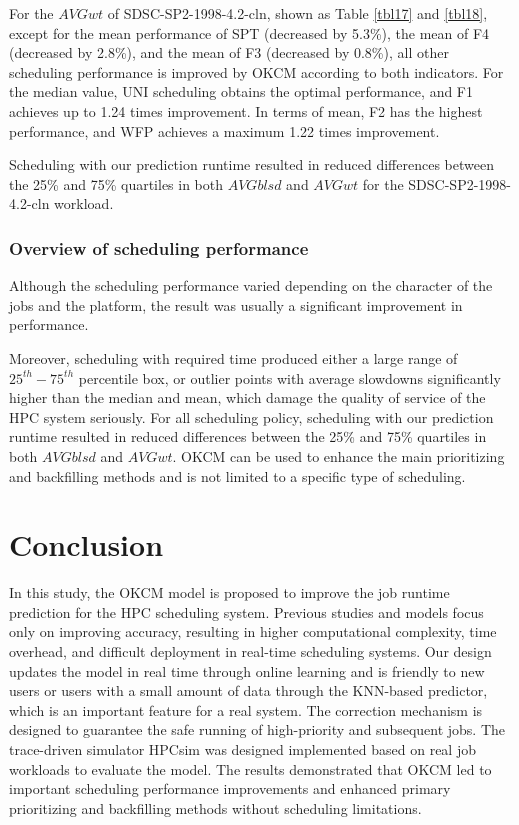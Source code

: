 \documentclass[a4paper,fleqn]{cas-sc}
\begin{document}
For the $A\!V\!Gwt$ of SDSC-SP2-1998-4.2-cln, shown as Table \ref{tbl17} and \ref{tbl18}, except for the mean performance of SPT (decreased by 5.3\%), the mean of F4 (decreased by 2.8\%), and the mean of F3 (decreased by 0.8\%), all other scheduling performance is improved by OKCM according to both indicators. For the median value, UNI scheduling obtains the optimal performance, and F1 achieves up to 1.24 times improvement. In terms of mean, F2 has the highest performance, and WFP achieves a maximum 1.22 times improvement. 

Scheduling with our prediction runtime resulted in reduced differences between the 25\% and 75\% quartiles in both $A\!V\!Gblsd$ and $A\!V\!Gwt$ for the SDSC-SP2-1998-4.2-cln workload.

\subsubsection{Overview of scheduling performance}
Although the scheduling performance varied depending on the character of the jobs and the platform, the result was usually a significant improvement in performance.
 
Moreover, scheduling with required time produced either a large range of $25^{th}-75^{th}$ percentile box, or outlier points with average slowdowns significantly higher than the median and mean, which damage the quality of service of the HPC system seriously. For all scheduling policy, scheduling with our prediction runtime resulted in reduced differences between the 25\% and 75\% quartiles in both $A\!V\!Gblsd$ and $A\!V\!Gwt$. OKCM can be used to enhance the main prioritizing and backfilling methods and is not limited to a specific type of scheduling.

\section{Conclusion} \label{sect5}
In this study, the OKCM model is proposed to improve the job runtime prediction for the HPC scheduling system. Previous studies and models focus only on improving accuracy, resulting in higher computational complexity, time overhead, and difficult deployment in real-time scheduling systems. Our design updates the model in real time through online learning and is friendly to new users or users with a small amount of data through the KNN-based predictor, which is an important feature for a real system. The correction mechanism is designed to guarantee the safe running of high-priority and subsequent jobs. The trace-driven simulator HPCsim was designed implemented based on real job workloads to evaluate the model. The results demonstrated that OKCM led to important scheduling performance improvements and enhanced primary prioritizing and backfilling methods without scheduling limitations.
\end{document}
